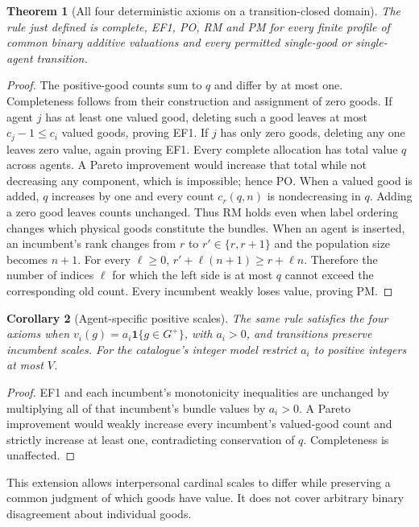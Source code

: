 \documentclass[11pt,a4paper]{article}
\newtheorem{theorem}{Theorem}
\newtheorem{corollary}[theorem]{Corollary}
\newcommand{\ind}{\mathbf 1}
\begin{document}
\begin{theorem}[All four deterministic axioms on a transition-closed domain]
The rule just defined is complete, EF1, PO, RM and PM for every finite profile of common binary additive valuations and every permitted single-good or single-agent transition.
\end{theorem}
\begin{proof}
The positive-good counts sum to $q$ and differ by at most one. Completeness follows from their construction and assignment of zero goods. If agent $j$ has at least one valued good, deleting such a good leaves at most $c_j-1\leq c_i$ valued goods, proving EF1. If $j$ has only zero goods, deleting any one leaves zero value, again proving EF1.
Every complete allocation has total value $q$ across agents. A Pareto improvement would increase that total while not decreasing any component, which is impossible; hence PO.
When a valued good is added, $q$ increases by one and every count $c_r(q,n)$ is nondecreasing in $q$. Adding a zero good leaves counts unchanged. Thus RM holds even when label ordering changes which physical goods constitute the bundles.
When an agent is inserted, an incumbent's rank changes from $r$ to $r'\in\{r,r+1\}$ and the population size becomes $n+1$. For every $\ell\geq0$,
$r'+\ell(n+1)\geq r+\ell n$. Therefore the number of indices $\ell$ for which the left side is at most $q$ cannot exceed the corresponding old count. Every incumbent weakly loses value, proving PM.
\end{proof}

\begin{corollary}[Agent-specific positive scales]
The same rule satisfies the four axioms when $v_i(g)=a_i\ind\{g\in G^+\}$, with $a_i>0$, and transitions preserve incumbent scales. For the catalogue's integer model restrict $a_i$ to positive integers at most $V$.
\end{corollary}
\begin{proof}
EF1 and each incumbent's monotonicity inequalities are unchanged by multiplying all of that incumbent's bundle values by $a_i>0$. A Pareto improvement would weakly increase every incumbent's valued-good count and strictly increase at least one, contradicting conservation of $q$. Completeness is unaffected.
\end{proof}
This extension allows interpersonal cardinal scales to differ while preserving a common judgment of which goods have value. It does not cover arbitrary binary disagreement about individual goods.
\end{document}
